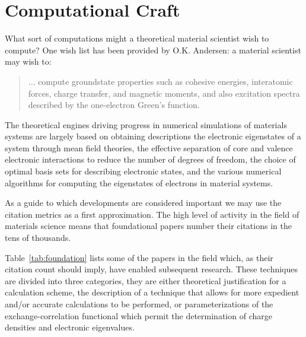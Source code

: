 \section{Computational Craft}
What sort of computations might a theoretical material scientist
wish to compute? One wish list has been provided by O.K. Andersen:
a material scientist may wish to:
\begin{quote}
... compute groundstate properties such as cohesive energies, interatomic forces, 
charge transfer, and magnetic moments, and also excitation spectra described 
by the one-electron Green's function\cite{anderson75}.
\end{quote}

The theoretical engines driving progress in numerical simulations of materials systems are
largely based on obtaining descriptions the electronic eigenstates 
of a system through mean field theories, the effective separation of core and 
valence electronic interactions to reduce the number of degrees of freedom, 
the choice of optimal basis sets for describing electronic states, 
and the various numerical algorithms for 
computing the eigenstates of electrons in material systems.

As a guide to which developments are considered important we may
use the citation metrics as a first approximation. The high level of 
activity in the field of materials science 
means that foundational papers number their citations in the tens of thousands. 

Table~\ref{tab:foundation} lists some of the papers in the field which, as
their citation count should imply, have enabled subsequent research. 
These techniques are divided into three categories, 
they are either theoretical justification for a calculation scheme, the description of
a technique that allows for more expedient and/or accurate calculations to be performed, 
or parameterizations of the exchange-correlation functional which permit the determination
of charge densities and electronic eigenvalues.

